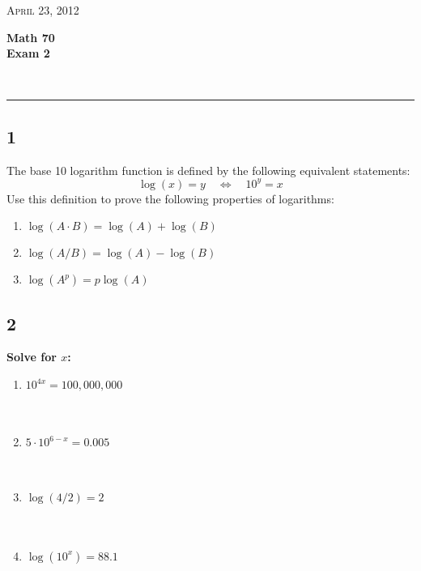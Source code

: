 \documentclass[11pt]{amsart}
\newcommand{\HRule}{\rule{\linewidth}{0.5mm}}
\begin{document}
\begin{minipage}{0.4\textwidth}
\begin{flushleft} \large
 \textsc{April 23, 2012}
\end{flushleft}
\end{minipage}
\begin{minipage}{0.6\textwidth}
\begin{flushright} \Large
{\bf Math 70   \\
Exam 2}
\end{flushright}
\end{minipage}\\

\HRule
\subsection*{1}
The base 10 logarithm function is defined by the following equivalent statements: 
$$ \log(x) = y \quad \Leftrightarrow \quad 10^y = x $$
Use this definition to prove the following properties of logarithms: 
\begin{enumerate}[a]
\item $\log(A\cdot B) = \log(A) + \log(B) $
\item $\log(A/B) = \log(A) - \log(B) $
\item $ \log(A^p) = p \log(A)$
\end{enumerate}




\newpage

\subsection*{2}   %
{\bf Solve for $x$:} 
\begin{enumerate}[a]
\item $10^{4x} = 100,000,000$\\ \\ \\ 
\item $5\cdot 10^{6-x} = 0.005 $ \\ \\ \\ 
\item $\log(4/2) = 2 $ \\ \\ \\
\item $ \log(10^x)= 88.1 $ \\ \\ \\
\end{enumerate}
\end{document}
